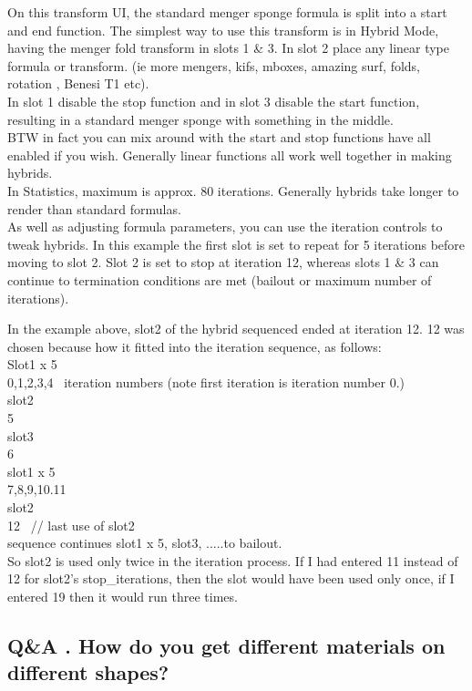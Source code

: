 On this transform UI, the standard menger sponge formula is split into a start
and end function. The simplest way to use this transform is in Hybrid Mode,
having the menger fold transform in slots 1 \& 3. In slot 2 place any linear
type formula or transform. (ie more mengers, kifs, mboxes, amazing surf, folds,
rotation , Benesi T1 etc).\\[2\baselineskip]In slot 1 disable the stop function
and in slot 3 disable the start function, resulting in a standard menger sponge
with something in the middle.\\[2\baselineskip]BTW in fact you can mix around
with the start and stop functions have all enabled if you wish. Generally linear
functions all work well together in making hybrids.\\[2\baselineskip]In
Statistics, maximum is approx. 80 iterations. Generally hybrids take longer to
render than standard formulas.\\ As well as adjusting formula parameters, you
can use the iteration controls to tweak hybrids. In this example the first slot
is set to repeat for 5 iterations before moving to slot 2. Slot 2 is set to stop
at iteration 12, whereas slots 1 \& 3 can continue to termination conditions are
met (bailout or maximum number of iterations).

In the example above, slot2 of the hybrid sequenced ended at iteration 12. 12
was chosen because how it fitted into the iteration sequence, as follows:\\
Slot1 x 5\\ 0,1,2,3,4~ iteration numbers (note first iteration is iteration
number 0.)\\ slot2\\ 5\\ slot3~\\ 6\\ slot1 x 5\\ 7,8,9,10.11\\ slot2\\ 12~ //
last use of slot2\\ \hspace*{0.333em}sequence continues slot1 x 5, slot3,
.....to bailout.\\ So slot2 is used only twice in the iteration process. If I
had entered 11 instead of 12 for slot2's stop\_iterations, then the slot would
have been used only once, if I entered 19 then it would run three times.

\subsection{Q\&A . How do you get different materials on different
	shapes?}\label{qa-.-how-do-you-get-different-materials-on-different-shapes}

